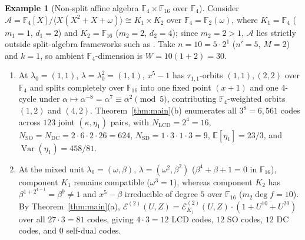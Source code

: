 \documentclass[preprint,12pt]{elsarticle}
\newcommand{\F}{\mathbb F}
\newcommand{\A}{\mathcal A}
\newcommand{\Epoly}{\mathscr E}
\newcommand{\Var}{\operatorname{Var}}
\numberwithin{equation}{section}
\theoremstyle{plain}
\theoremstyle{definition}
\newtheorem{example}[theorem]{Example}
\theoremstyle{remark}
\begin{document}
\begin{example}[Non-split affine algebra $\F_4\times\F_{16}$ over $\F_4$]\label{ex:mixed-F4-F16}
Consider $\A=\F_4[X]/\langle X(X^2+X+\omega)\rangle\cong K_1\times K_2$ over
$\F_4=\F_2(\omega)$, where $K_1=\F_4$ ($m_1=1$, $d_1=2$) and $K_2=\F_{16}$
($m_2=2$, $d_2=4$); since $m_2=2>1$, $\A$ lies strictly outside split-algebra
frameworks such as \cite{debnathAffine2026}. Take $n=10=5\cdot 2^1$ ($n'=5$,
$M=2$) and $k=1$, so ambient $\F_4$-dimension is $W=10(1+2)=30$.
\begin{enumerate}
\item[\textup{(a)}] At $\lambda_0=(1,1)$, $\lambda=\lambda_0^2=(1,1)$, $x^5-1$ has
$\tau_{1,1}$-orbits $(1,1),(2,2)$ over $\F_4$ and splits completely over $\F_{16}$
into one fixed point $(x+1)$ and one $4$-cycle under $\alpha\mapsto\alpha^{-8}=\alpha^7
\equiv\alpha^2\pmod 5$, contributing $\F_4$-weighted orbits $(1,2)$ and $(4,2)$.
Theorem~\ref{thm:main}\textup{(b)} enumerates all $3^8=6{,}561$ codes across $123$
joint $(\kappa,\eta_1)$ pairs, with $N_{\mathrm{LCD}}=2^4=16$,
$N_{\mathrm{SO}}=N_{\mathrm{DC}}=2\cdot 6\cdot 2\cdot 26=624$,
$N_{\mathrm{SD}}=1\cdot 3\cdot 1\cdot 3=9$, $\mathbb E[\eta_1]=23/3$, and
$\Var(\eta_1)=458/81$.
\item[\textup{(b)}] At the mixed unit $\lambda_0=(\omega,\beta)$,
$\lambda=(\omega^2,\beta^2)$ ($\beta^4+\beta+1=0$ in $\F_{16}$), component $K_1$
remains compatible ($\omega^3=1$), whereas component $K_2$ has
$\beta^{1+2^{4-1}}=\beta^9\neq 1$ and $x^5-\beta$ irreducible of degree $5$ over
$\F_{16}$ ($m_2\deg f=10$). By Theorem~\ref{thm:main}\textup{(a)},
$\Epoly^{(2)}(U,Z)=\Epoly_{K_1}^{(2)}(U,Z)\cdot(1+U^{10}+U^{20})$ over all
$27\cdot 3=81$ codes, giving $4\cdot 3=12$ LCD codes, $12$ SO codes, $12$ DC
codes, and $0$ self-dual codes.
\end{enumerate}
\end{example}
\end{document}
